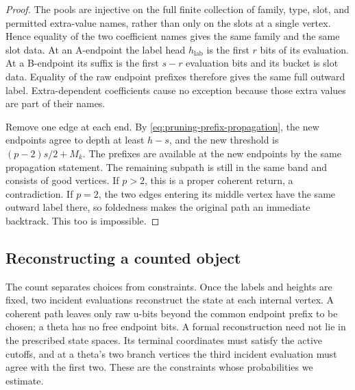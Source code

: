 \begin{proof}
The pools are injective on the full finite collection of family, type,
slot, and permitted extra-value names, rather than only on the slots
at a single vertex.  Hence equality of the two coefficient names gives
the same family and the same slot data.  At an A-endpoint the label head
$h_{\mathrm{lab}}$ is the first $r$ bits of its evaluation.  At a
B-endpoint its suffix is the first $s-r$ evaluation bits and its bucket
is slot data.  Equality of the raw endpoint prefixes therefore gives
the same full outward label.  Extra-dependent coefficients cause no
exception because those extra values are part of their names.

Remove one edge at each end.  By
\eqref{eq:pruning-prefix-propagation}, the new endpoints agree to
depth at least $h-s$, and the new threshold is
$(p-2)s/2+M_k$.  The prefixes are available at the new endpoints by
the same propagation statement.  The remaining subpath is still in
the same band and consists of good vertices.  If $p>2$, this is a
proper coherent return, a contradiction.  If $p=2$, the two edges
entering its middle vertex have the same outward label there, so
foldedness makes the original path an immediate backtrack.  This too
is impossible.
\end{proof}

\subsection{Reconstructing a counted object}

The count separates choices from constraints.  Once the labels and
heights are fixed, two incident evaluations reconstruct the state at
each internal vertex.  A coherent path leaves only raw u-bits beyond
the common endpoint prefix to be chosen; a theta has no free endpoint
bits.  A formal reconstruction need not lie in the prescribed state
spaces.  Its terminal coordinates must satisfy the active cutoffs, and
at a theta's two branch vertices the third incident evaluation must
agree with the first two.  These are the constraints whose probabilities
we estimate.

